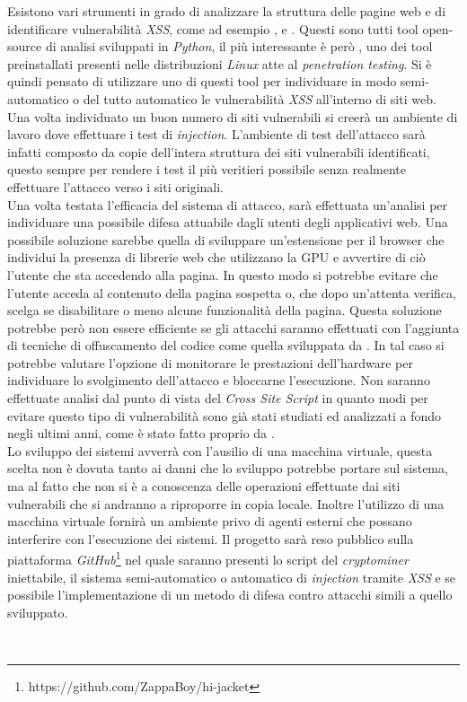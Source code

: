 \documentclass[
11pt, %
oneside, %
italian, %
onehalfspacing,%
headsepline, %
]{MastersDoctoralThesis} %
\newcommand\citen[1]{\citeauthor{#1} \citep{#1}}
\newcommand\citetitlen[1]{\citetitle{#1} \citep{#1}}
\begin{document}
Esistono vari strumenti in grado di analizzare la struttura delle pagine web e di identificare vulnerabilità \emph{XSS}, come ad esempio \citetitlen{XSStrike}, \citetitlen{Traxss} e \citetitlen{XSSer}. Questi sono tutti tool open-source di analisi sviluppati in \emph{Python}, il più interessante è però , uno dei tool preinstallati presenti nelle distribuzioni \emph{Linux} atte al \emph{penetration testing}. Si è quindi pensato di utilizzare uno di questi tool per individuare in modo semi-automatico o del tutto automatico le vulnerabilità \emph{XSS} all'interno di siti web. Una volta individuato un buon numero di siti vulnerabili si creerà un ambiente di lavoro dove effettuare i test di \emph{injection}. L'ambiente di test dell'attacco sarà infatti composto da copie dell'intera struttura dei siti vulnerabili identificati, questo sempre per rendere i test il più veritieri possibile senza realmente effettuare l'attacco verso i siti originali.\\
Una volta testata l'efficacia del sistema di attacco, sarà effettuata un'analisi per individuare una possibile difesa attuabile dagli utenti degli applicativi web. Una possibile soluzione sarebbe quella di sviluppare un'estensione per il browser che individui la presenza di librerie web che utilizzano la GPU e avvertire di ciò l'utente che sta accedendo alla pagina. In questo modo si potrebbe evitare che l'utente acceda al contenuto della pagina sospetta o, che dopo un'attenta verifica, scelga se disabilitare o meno alcune funzionalità della pagina. Questa soluzione potrebbe però non essere efficiente se gli attacchi saranno effettuati con l'aggiunta di tecniche di offuscamento del codice come quella sviluppata da \citen{sharif2008impeding}. In tal caso si potrebbe valutare l'opzione di monitorare le prestazioni dell'hardware per individuare lo svolgimento dell'attacco e bloccarne l'esecuzione. Non saranno effettuate analisi dal punto di vista del \emph{Cross Site Script} in quanto modi per evitare questo tipo di vulnerabilità sono già stati studiati ed analizzati a fondo negli ultimi anni, come è stato fatto proprio da \citen{bisht2008xss}.\\
Lo sviluppo dei sistemi avverrà con l'ausilio di una macchina virtuale, questa scelta non è dovuta tanto ai danni che lo sviluppo potrebbe portare sul sistema, ma al fatto che non si è a conoscenza delle operazioni effettuate dai siti vulnerabili che si andranno a riproporre in copia locale. Inoltre l'utilizzo di una macchina virtuale fornirà un ambiente privo di agenti esterni che possano interferire con l'esecuzione dei sistemi. Il progetto sarà reso pubblico sulla piattaforma \emph{GitHub}\footnote{https://github.com/ZappaBoy/hi-jacket} nel quale saranno presenti lo script del \emph{cryptominer} iniettabile, il sistema semi-automatico o automatico di \emph{injection} tramite \emph{XSS} e se possibile l'implementazione di un metodo di difesa contro attacchi simili a quello sviluppato.


\printbibliography\
\end{document}
